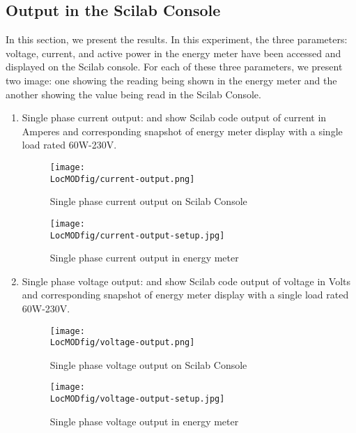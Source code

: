 \subsection{Output in the Scilab Console}
In this section, we present the results. In this experiment, the three parameters: 
voltage, current, and active power in the energy meter have been accessed and displayed
on the Scilab console. For each of these three parameters, we present two image: one showing 
the reading being shown in the energy meter and the another showing the 
value being read in the Scilab Console. 
\begin{enumerate}
  \item Single phase current output:  and
         show Scilab code output of current in
        Amperes and corresponding snapshot of energy meter display with a
        single load rated 60W-230V.
        
        \begin{figure}
          \centering
          \texttt{[image: \\LocMODfig/current-output.png]}
          \caption{Single phase current output on Scilab Console}
          \label{fig:current-console}
        \end{figure}
        
        \begin{figure}
          \centering
          \texttt{[image: \\LocMODfig/current-output-setup.jpg]}
          \caption{Single phase current output in energy meter}
          \label{fig:current-meter}
        \end{figure}
        
  \item Single phase voltage output:  and
         show Scilab code output of voltage in
        Volts and corresponding snapshot of energy meter display with a
        single load rated 60W-230V.
        
        \begin{figure}
          \centering
          \texttt{[image: \\LocMODfig/voltage-output.png]}
          \caption{Single phase voltage output on Scilab Console}
          \label{fig:voltage-console}
        \end{figure}
        
        \begin{figure}
          \centering
          \texttt{[image: \\LocMODfig/voltage-output-setup.jpg]}
          \caption{Single phase voltage output in energy meter}
          \label{fig:voltage-meter}
        \end{figure}
        

\end{enumerate}
